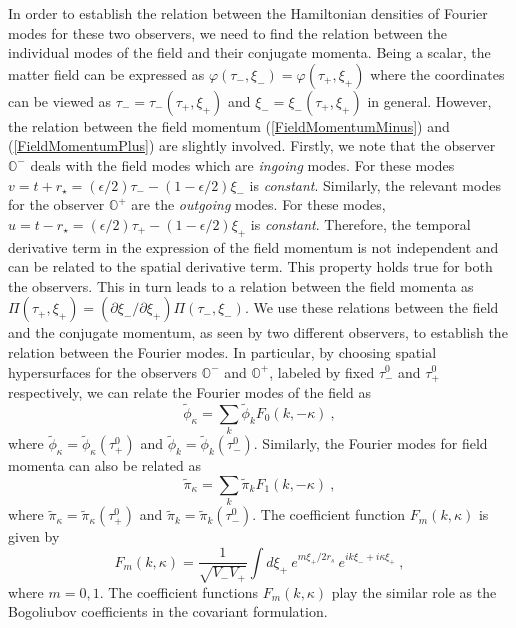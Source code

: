 \documentclass[aps,twocolumn,showpacs]{revtex4}
\def\kr{\kappa}
\def\rs{r_s}
\def\rstar{r_{\star}}
\def\observerminus{\mathbb{O}^{-}}
\def\observerplus{\mathbb{O}^{+}}
\begin{document}
In order to establish the relation between the Hamiltonian densities of Fourier 
modes for these two observers, we need to find the relation between the 
individual modes of the field and their conjugate momenta. Being a scalar, the 
matter field can be expressed as $\varphi(\tau_{-},\xi_{-}) = 
\varphi(\tau_{+},\xi_{+})$ where the coordinates can be viewed as $\tau_{-} = 
\tau_{-}(\tau_{+},\xi_{+})$ and $\xi_{-} = \xi_{-}(\tau_{+},\xi_{+})$ in 
general. However, the relation between the field momentum 
(\ref{FieldMomentumMinus}) and (\ref{FieldMomentumPlus}) are slightly involved. 
Firstly, we note that the observer $\observerminus$ deals with the field modes 
which are \emph{ingoing} modes. For these modes $v = t + \rstar = 
(\epsilon/2)\tau_{-} - (1-\epsilon/2) \xi_{-}$  is \emph{constant}. Similarly, 
the relevant modes for the observer $\observerplus$ are the \emph{outgoing} 
modes. For these modes, $u = t - \rstar = (\epsilon/2)\tau_{+} - (1-\epsilon/2) 
\xi_{+}$ is \emph{constant}. Therefore, the temporal derivative term in the 
expression of the field momentum is not independent and can be related to the 
spatial derivative term. This property holds true for both the observers. This 
in turn leads to a relation between the field momenta as $\Pi(\tau_{+},\xi_{+}) 
= (\partial \xi_{-}/\partial \xi_{+}) \Pi(\tau_{-},\xi_{-})$.
%
We use these relations between the field and the conjugate momentum, as seen by 
two different observers, to establish the relation between the Fourier modes. In 
particular, by choosing spatial hypersurfaces for the observers $\observerminus$ 
and $\observerplus$, labeled by fixed $\tau_{-}^0$ and $\tau_{+}^0$ 
respectively, we can relate the Fourier modes of the field as
%
\begin{equation}\label{FieldModesRelation}
\tilde{\phi}_{\kr} = \sum_{k} \tilde{\phi}_{k} F_{0}(k,-\kr) ~,
\end{equation}
%
where $\tilde{\phi}_{\kr} = \tilde{\phi}_{\kr}(\tau_{+}^0)$ and 
$\tilde{\phi}_{k} = \tilde{\phi}_{k}(\tau_{-}^0)$. Similarly, the Fourier modes 
for field momenta can also be related as
%
\begin{equation}\label{FieldMomentaModesRelation}
\tilde{\pi}_{\kr} =  \sum_{k} \tilde{\pi}_{k} F_{1}(k,-\kr)  ~,
\end{equation}
%
where $\tilde{\pi}_{\kr} = \tilde{\pi}_{\kr}(\tau_{+}^0)$ and 
$\tilde{\pi}_{k} = \tilde{\pi}_{k}(\tau_{-}^0)$. The coefficient function
$F_{m}(k,\kr)$ is given by
%
\begin{equation}\label{FFunctionGeneral}
F_{m}(k,\kr) = \frac{1}{\sqrt{V_{-} V_{+}}} 
\int d\xi_{+} ~e^{m\xi_{+}/2 \rs} ~e^{i k \xi_{-} + 
i \kr \xi_{+}} ~,
\end{equation}
%
where $m=0,1$. The coefficient functions $F_{m}(k,\kr)$ play the similar role 
as the Bogoliubov coefficients in the covariant formulation.
\end{document}
